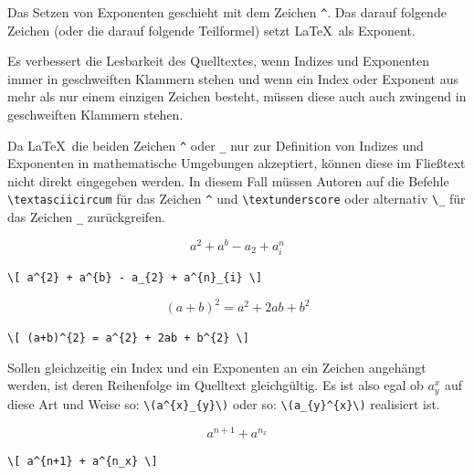 \documentclass[a4paper,10pt,twoside]{scrbook}
\begin{document}

Das Setzen von Exponenten geschieht mit dem Zeichen 
\verb!^!. Das darauf folgende Zeichen 
(oder die darauf folgende Teilformel) 
setzt \LaTeX\ als Exponent.


Es verbessert die Lesbarkeit
des Quelltextes, wenn Indizes und Exponenten immer in geschweiften Klammern stehen
und wenn ein Index oder Exponent aus mehr als nur einem einzigen Zeichen besteht, 
müssen diese auch auch zwingend in geschweiften Klammern stehen.

Da \LaTeX\ die beiden Zeichen \verb!^! oder \verb!_! nur zur Definition von
Indizes und Exponenten in mathematische Umgebungen akzeptiert, können diese 
im Fließtext nicht direkt eingegeben werden. In diesem Fall 
müssen Autoren auf die Befehle \verb!\textasciicircum!
für das Zeichen \verb!^! und \verb!\textunderscore!
oder alternativ \verb!\_! für das Zeichen \verb!_! zurückgreifen.


\begin{minipage}[c]{.4\textwidth}
\vspace*{-5mm}
\[ a^{2} + a^{b} - a_{2} + a^{n}_{i} \]
\end{minipage}
\hfill
\begin{minipage}[c]{.58\textwidth}
\setlength{\parskip}{1em}
\verb!\[ a^{2} + a^{b} - a_{2} + a^{n}_{i} \]!
\end{minipage}

\begin{minipage}[c]{.4\textwidth}
\vspace*{-5mm}
\[ (a+b)^{2} = a^{2} + 2ab + b^{2} \]
\end{minipage}
\hfill
\begin{minipage}[c]{.58\textwidth}
\setlength{\parskip}{1em}
\verb!\[ (a+b)^{2} = a^{2} + 2ab + b^{2} \]!
\end{minipage}


Sollen gleichzeitig ein Index und ein Exponenten an ein Zeichen angehängt werden, ist deren
Reihenfolge im Quelltext gleichgültig. Es ist also egal ob \(a^{x}_{y}\) auf diese Art und Weise 
so: \verb!\(a^{x}_{y}\)! oder so: \verb!\(a_{y}^{x}\)! realisiert ist. 

\begin{minipage}[c]{.4\textwidth}
\vspace*{-5mm}
\[ a^{n+1} + a^{n_x} \]
\end{minipage}
\hfill
\begin{minipage}[c]{.58\textwidth}
\setlength{\parskip}{1em}
\verb!\[ a^{n+1} + a^{n_x} \]!
\end{minipage}
\end{document}
